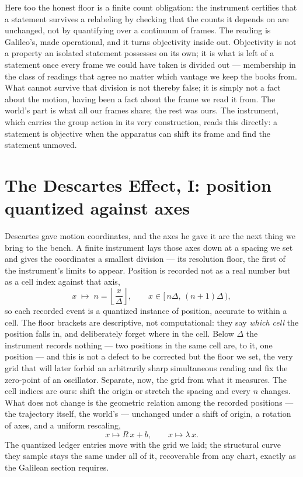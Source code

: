 Here too the honest floor is a finite count obligation: the instrument certifies that a statement survives a
relabeling by checking that the counts it depends on are unchanged, not by quantifying over a continuum of
frames. The reading is Galileo's, made operational, and it turns objectivity inside out. Objectivity is not a
property an isolated statement possesses on its own; it is what is left of a statement once every frame we
could have taken is divided out --- membership in the class of readings that agree no matter which vantage we
keep the books from. What cannot survive that division is not thereby false; it is simply not a fact about the
motion, having been a fact about the frame we read it from. The world's part is what all our frames share; the
rest was ours. The instrument, which carries the group action in its very construction, reads this directly: a
statement is objective when the apparatus can shift its frame and find the statement unmoved.

\section{The Descartes Effect, I: position quantized against axes}
\label{se:descartes-i}

Descartes gave motion coordinates, and the axes he gave it are the next thing we bring to the bench. A finite
instrument lays those axes down at a spacing we set and gives the coordinates a smallest division --- its
resolution floor, the first of the instrument's limits to appear. Position is recorded not as a real number
but as a cell index against that axis,
\begin{equation}
  x \;\longmapsto\; n = \left\lfloor \frac{x}{\Delta} \right\rfloor, \qquad x \in [\,n\Delta,\,(n+1)\Delta\,),
\end{equation}
so each recorded event is a quantized instance of position, accurate to within a cell. The floor brackets are
descriptive, not computational: they say \emph{which cell} the position falls in, and deliberately forget
where in the cell. Below $\Delta$ the instrument records nothing --- two positions in the same cell are, to
it, one position --- and this is not a defect to be corrected but the floor we set, the very grid that will
later forbid an arbitrarily sharp simultaneous reading and fix the zero-point of an oscillator. Separate, now,
the grid from what it measures. The cell indices are ours: shift the origin or stretch the spacing and every
$n$ changes. What does not change is the geometric relation among the recorded positions --- the trajectory
itself, the world's --- unchanged under a shift of origin, a rotation of axes, and a uniform rescaling,
\begin{equation}
  x \mapsto R\,x + b, \qquad x \mapsto \lambda\, x .
\end{equation}
The quantized ledger entries move with the grid we laid; the structural curve they sample stays the same under
all of it, recoverable from any chart, exactly as the Galilean section requires.

